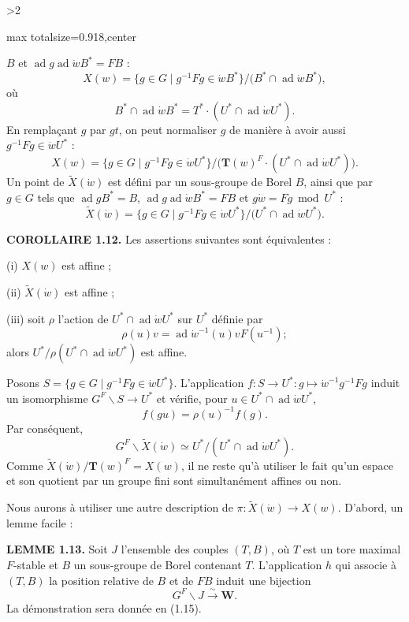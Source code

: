 \documentclass[9pt,twoside]{extarticle}
\newcommand{\EditionPage}[3]{%
  \ifnum#1>2\clearpage\fi
  \pdfbookmark[1]{Printed page #2}{fr-folio-#2}%
  \hypertarget{fr-physical-#1}{}%
  \noindent\begin{adjustbox}{max totalsize={\textwidth}{0.918\textheight},center}
  \begin{minipage}[t]{\textwidth}
  \fontsize{9.4}{11.1}\selectfont\justifying
  #3
  \end{minipage}
  \end{adjustbox}%
}
\begin{document}
\EditionPage{11}{112}{%
\(B\) et \(\operatorname{ad}g\operatorname{ad}\dot wB^*=FB\) : \[
\tag{1.11.2}
X(w)=\{g\in G\mid g^{-1}Fg\in\dot wB^*\}/\bigl(B^*\cap\operatorname{ad}\dot wB^*\bigr),
\] où \[
B^*\cap\operatorname{ad}\dot wB^*=T^*\cdot(U^*\cap\operatorname{ad}\dot wU^*).
\] En remplaçant \(g\) par \(gt\), on peut normaliser \(g\) de manière à avoir aussi \(g^{-1}Fg\in\dot wU^*\) : \[
\tag{1.11.3}
X(w)=\{g\in G\mid g^{-1}Fg\in\dot wU^*\}/\bigl(\mathbf T(w)^F\cdot(U^*\cap\operatorname{ad}\dot wU^*)\bigr).
\] Un point de \(\widetilde X(\dot w)\) est défini par un sous-groupe de Borel \(B\), ainsi que par \(g\in G\) tels que \(\operatorname{ad}gB^*=B\), \(\operatorname{ad}g\operatorname{ad}\dot wB^*=FB\) et \(g\dot w=Fg\bmod U^*\) : \[
\tag{1.11.4}
\widetilde X(\dot w)=\{g\in G\mid g^{-1}Fg\in\dot wU^*\}/\bigl(U^*\cap\operatorname{ad}\dot wU^*\bigr).
\]\par

\noindent\textbf{COROLLAIRE 1.12.} Les assertions suivantes sont équivalentes :\par

(i) \(X(w)\) est affine ;\par

(ii) \(\widetilde X(\dot w)\) est affine ;\par

(iii) soit \(\rho\) l'action de \(U^*\cap\operatorname{ad}\dot wU^*\) sur \(U^*\) définie par \[
\rho(u)v=\operatorname{ad}\dot w^{-1}(u)vF(u^{-1}) ;
\] alors \(U^*/\rho(U^*\cap\operatorname{ad}\dot wU^*)\) est affine.\par

Posons \(S=\{g\in G\mid g^{-1}Fg\in\dot wU^*\}\). L'application \(f:S\to U^*:g\mapsto\dot w^{-1}g^{-1}Fg\) induit un isomorphisme \(G^F\backslash S\to U^*\) et vérifie, pour \(u\in U^*\cap\operatorname{ad}\dot wU^*\), \[
f(gu)=\rho(u)^{-1}f(g).
\] Par conséquent, \[
G^F\backslash\widetilde X(\dot w)\simeq U^*/(U^*\cap\operatorname{ad}\dot wU^*).
\] Comme \(\widetilde X(\dot w)/\mathbf T(w)^F=X(w)\), il ne reste qu'à utiliser le fait qu'un espace et son quotient par un groupe fini sont simultanément affines ou non.\par

Nous aurons à utiliser une autre description de \(\pi:\widetilde X(\dot w)\to X(w)\). D'abord, un lemme facile :\par

\noindent\textbf{LEMME 1.13.} Soit \(J\) l'ensemble des couples \((T,B)\), où \(T\) est un tore maximal \(F\)-stable et \(B\) un sous-groupe de Borel contenant \(T\). L'application \(h\) qui associe à \((T,B)\) la position relative de \(B\) et de \(FB\) induit une bijection \[
G^F\backslash J\xrightarrow{\sim}\mathbf W.
\] La démonstration sera donnée en (1.15).\par

}
\end{document}
